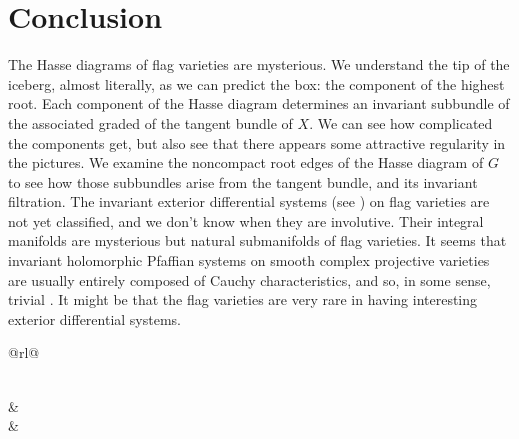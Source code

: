 \documentclass[a4paper,10pt]{amsart}
\theoremstyle{remark}
\begin{document}
\section{Conclusion}
The Hasse diagrams of flag varieties are mysterious.
We understand the tip of the iceberg, almost literally, as we can predict the box: the component of the highest root.
Each component of the Hasse diagram determines an invariant subbundle of the associated graded of the tangent bundle of \(X\).
We can see how complicated the components get, but also see that there appears some attractive regularity in the pictures.
We examine the noncompact root edges of the Hasse diagram of \(G\) to see how those subbundles arise from the tangent bundle, and its invariant filtration.
The invariant exterior differential systems (see \cite{Bryant:1982,Bryant:2000,BCGGG:1991,Ivey.Landsberg:2016}) on flag varieties are not yet classified, and we don't know when they are involutive.
Their integral manifolds are mysterious but natural submanifolds of flag varieties.
It seems that invariant holomorphic Pfaffian systems on smooth complex projective varieties are usually entirely composed of Cauchy characteristics, and so, in some sense, trivial \cite{Demailly:2002}.
It might be that the flag varieties are very rare in having interesting exterior differential systems.
\newpage
\makeatletter
\lie@hasse@multiple@diagramsfalse
\tikzset{/Lie Hasse diagram,show name=true,ordering=Carter}
\tikzset{/Dynkin diagram/ordering=Carter}
\begin{longtable}{@{}rl@{}}%
\caption{Exceptional Hasse diagrams}\label{table:exceptionals}\\
&\\
&\\
\end{longtable}
\makeatother
\newpage
%
\begingroup
\tikzset{/Dynkin diagram/ordering=Carter}
\newcommand{\hasseEntry}[1]%
{%
	&%
	\multicolumn{3}%
	{%
		>{\columncolor[gray]{.96}\centering\arraybackslash}%
		m{\hasseEntryWidth}%
	}%
	{%
		\begin{tikzpicture}[%
			background rectangle/.style={},%
			background top/.style={%
				draw=black,%
				opacity=0,%
				line width=1ex},%
			framed,%
			show background top]%
		\hasse[three D=false]#1%
		\end{tikzpicture}%
	}%
}%
\small%
\setlength{\tabcolsep}{4pt}%
\end{document}
